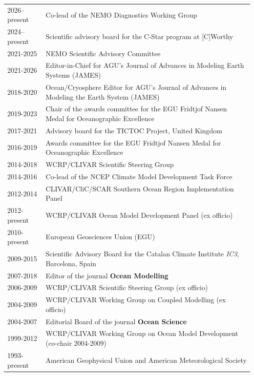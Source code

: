 \documentclass{article}
\begin{document}
\begin{tabular}{ll}
    2026--present & Co-lead of the NEMO Diagnostics Working Group
  \\
      2024--present & Scientific advisory board for the C-Star program at [C]Worthy
  \\
2021-2025 & NEMO Scientific Advisory Committee
\\

2021-2026 & Editor-in-Chief for  AGU's  Journal of Advances in Modeling Earth Systems (JAMES) 
 \\
2018-2020 & Ocean/Cryosphere Editor for AGU's  
Journal of Advances in Modeling the Earth System (JAMES) 
\\
2019-2023 & Chair of the awards committee for the EGU Fridtjof Nansen Medal for Oceanographic Excellence
\\
2017-2021 & Advisory board for the TICTOC Project, United Kingdom
\\
  2016-2019 & Awards committee for the EGU Fridtjof Nansen Medal for Oceanographic Excellence 
  \\
2014-2018 &  WCRP/CLIVAR Scientific Steering Group 
\\
2014-2016     & Co-lead of the NCEP Climate Model Development Task Force
\\
2012-2014     & CLIVAR/CliC/SCAR Southern Ocean Region Implementation Panel 
\\
2012-present &  WCRP/CLIVAR Ocean Model Development Panel (ex officio)
\\
2010-present & European Geosciences Union (EGU)
\\
2009-2015  &  Scientific Advisory Board for the Catalan  Climate Institute {\it IC3}, Barcelona, Spain 
\\
2007-2018 & Editor of the journal {\bf Ocean Modelling} 
\\
2006-2009     &  WCRP/CLIVAR Scientific Steering Group (ex officio) 
\\
2004-2009     &  WCRP/CLIVAR Working Group on Coupled Modelling (ex officio) \\

2004-2007     & Editorial Board of the journal {\bf Ocean Science} \\

1999-2012     & WCRP/CLIVAR Working Group on Ocean Model Development  (co-chair 2004-2009) \\

1993-present  & American Geophysical Union and American Meteorological Society \\

\end{tabular}
\end{document}
